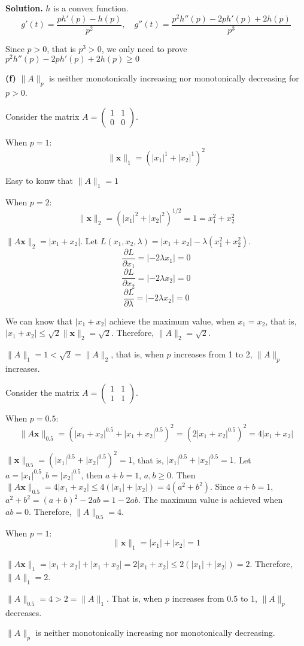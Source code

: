 \documentclass[12pt, a4paper, oneside]{ctexart}
\newenvironment{solution}{\par\noindent\textbf{Solution. }}{\par}
\begin{document}
\begin{solution}
$h$ is a convex function.
$$
g'(t)=\frac{ph'(p)-h(p)}{p^2}, \quad g''(t)=\frac{p^2 h''(p)-2ph'(p)+2h(p)}{p^3}
$$

Since $p>0$, that is $p^3>0$, we only need to prove $p^2 h''(p)-2ph'(p)+2h(p) \geq 0$

\vspace{12pt}

\textbf{(f)}
$\|A\|_p$ is neither monotonically increasing nor monotonically decreasing for $p>0$.

Consider the matrix $ A=\begin{pmatrix}1&1\\0&0\end{pmatrix} $.

When $ p = 1 $:
$$
\|\mathbf{x}\|_{1}=\left(|x_1|^{1}+|x_2|^{1}\right)^2
$$

Easy to konw that $ \|A\|_{1}=1$

When $ p = 2 $:
$$
\|\mathbf{x}\|_2=\left(|x_1|^2+|x_2|^2\right)^{1/2}=1=x_1^2+x_2^2
$$

$ \|A\mathbf{x}\|_2 = |x_1 + x_2| $. Let $L(x_1,x_2,\lambda)=|x_1+x_2|-\lambda(x_1^2+x_2^2)$.
$$
\frac{\partial L}{\partial x_1}=|-2\lambda x_1|=0
$$
$$
\frac{\partial L}{\partial x_2}=|-2\lambda x_2|=0
$$
$$
\frac{\partial L}{\partial \lambda}=|-2\lambda x_2|=0
$$

We can know that $|x_1 + x_2|$ achieve the maximum value, when $x_1=x_2$, that is,
$ |x_1 + x_2|\leq\sqrt{2}\|\mathbf{x}\|_2=\sqrt{2} $. Therefore, $ \|A\|_2=\sqrt{2}$.

$ \|A\|_{1}=1<\sqrt{2}=\|A\|_2 $, that is, when $ p $ increases from 1 to 2, $ \|A\|_p $ increases.

Consider the matrix $ A=\begin{pmatrix}1&1\\1&1\end{pmatrix} $.

When $ p = 0.5 $:
$$
\|A\mathbf{x}\|_{0.5}=\left(|x_1 + x_2|^{0.5}+|x_1 + x_2|^{0.5}\right)^2=(2|x_1 + x_2|^{0.5})^2 = 4|x_1 + x_2|
$$

$ \|\mathbf{x}\|_{0.5}=\left(|x_1|^{0.5}+|x_2|^{0.5}\right)^2 = 1 $, that is, $ |x_1|^{0.5}+|x_2|^{0.5}=1 $. Let $ a = |x_1|^{0.5}, b = |x_2|^{0.5} $, then $ a + b = 1 $, $ a,b\geq0 $. Then $ \|A\mathbf{x}\|_{0.5}=4|x_1 + x_2|\leq4(|x_1|+|x_2|)=4(a^2 + b^2) $. Since $ a + b = 1 $, $a^2 + b^2=(a + b)^2-2ab = 1 - 2ab $. The maximum value is achieved when $ ab = 0 $. Therefore, $ \|A\|_{0.5}=4 $.

When $ p = 1 $:
$$
\|\mathbf{x}\|_1=|x_1|+|x_2| = 1
$$

$ \|A\mathbf{x}\|_1=|x_1 + x_2|+|x_1 + x_2| = 2|x_1 + x_2|\leq2(|x_1|+|x_2|)=2 $. Therefore, $ \|A\|_1 = 2 $.

$ \|A\|_{0.5}=4>2=\|A\|_1$. That is, when $ p $ increases from 0.5 to 1, $ \|A\|_p $ decreases.

$\|A\|_p$ is neither monotonically increasing nor monotonically decreasing.

\end{solution}
\end{document}
